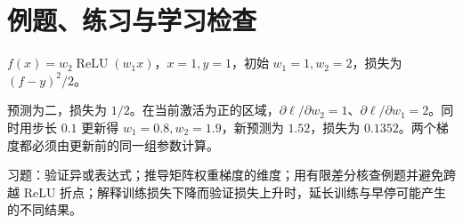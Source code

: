 \section{例题、练习与学习检查}

\begin{example}[一个两层网络的梯度]
$f(x)=w_2\operatorname{ReLU}(w_1x)$，$x=1,y=1$，初始 $w_1=1,w_2=2$，损失为 $(f-y)^2/2$。
\end{example}
\begin{solve}
预测为二，损失为 $1/2$。在当前激活为正的区域，$\partial\ell/\partial w_2=1$、$\partial\ell/\partial w_1=2$。同时用步长 $0.1$ 更新得 $w_1=0.8,w_2=1.9$，新预测为 $1.52$，损失为 $0.1352$。两个梯度都必须由更新前的同一组参数计算。
\end{solve}

习题：验证异或表达式；推导矩阵权重梯度的维度；用有限差分核查例题并避免跨越 ReLU 折点；解释训练损失下降而验证损失上升时，延长训练与早停可能产生的不同结果。





